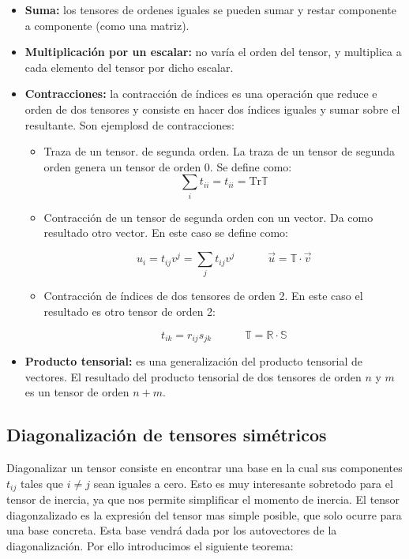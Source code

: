 \documentclass[12pt,a4paper]{book}
\newcommand{\tquad}{\quad \quad \quad}
\begin{document}
\begin{itemize}
\item \textbf{Suma:} los tensores de ordenes iguales se pueden sumar y restar componente a componente (como una matriz).
\item \textbf{Multiplicación por un escalar:} no varía el orden del tensor, y multiplica a cada elemento del tensor por dicho escalar.
\item \textbf{Contracciones:} la contracción de índices es una operación que reduce e orden de dos tensores y consiste en hacer dos índices iguales y sumar sobre el resultante. Son ejemplosd de contracciones:
\begin{itemize}
\item Traza de un tensor. de segunda orden. La traza de un tensor de segunda orden genera un tensor de orden 0. Se define como:
\begin{equation}
\sum_{i} t_{ii} = t_{ii} = \mathrm{Tr} \mathbb{T}
\end{equation}

\item Contracción de un tensor de segunda orden con un vector. Da como resultado otro vector. En este caso se define como:

\begin{equation}
u_i = t_{ij} v^j = \sum_j t_{ij} v^j \tquad  \vec{u} = \mathbb{T} \cdot \vec{v}
\end{equation}

\item  Contracción de índices de dos tensores de orden 2. En este caso el resultado es otro tensor de orden 2:

\begin{equation}
t_{ik}  = r_{ij} s_{jk} \tquad \mathbb{T} = \mathbb{R} \cdot \mathbb{S}
\end{equation}
\end{itemize}
\item \textbf{Producto tensorial:} es una generalización del producto tensorial de vectores. El resultado del producto tensorial de dos tensores de orden $n$ y $m$ es un tensor de orden $n+m$.
\end{itemize}

\subsection{Diagonalización de tensores simétricos}

Diagonalizar un tensor consiste en encontrar una base en la cual sus componentes $t_{ij}$ tales que $i \neq j$ sean iguales a cero. Esto es muy interesante sobretodo para el tensor de inercia, ya que nos permite simplificar el momento de inercia. El tensor diagonzalizado es la expresión del tensor mas simple posible, que solo ocurre para una base concreta. Esta base vendrá dada por los autovectores de la diagonalización. Por ello introducimos el siguiente teorema:
\end{document}
